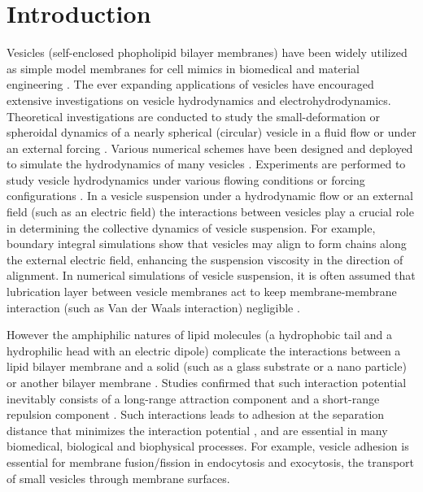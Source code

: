 \documentclass[%
preprint,
 amsmath,amssymb,
 aps,
]{revtex4-1}
\begin{document}

\section{Introduction}
Vesicles (self-enclosed phopholipid bilayer membranes) have been widely utilized
as simple model membranes for cell mimics in biomedical and material engineering \cite{}. 
%
The ever expanding applications of vesicles have encouraged extensive investigations on vesicle hydrodynamics
and electrohydrodynamics.
Theoretical investigations are conducted to study the small-deformation or spheroidal dynamics of a nearly spherical (circular) vesicle in a fluid flow or under an external forcing \cite{Barthes-BieselRallison1981_JFM,Misbah2006_PRL,Vlahovska2007_PRE,Finken2008_EPL,ZhangZahnTanLin2013_PoF,Nganguia2013_PRE}. 
Various numerical schemes have been designed and deployed to simulate the hydrodynamics of many vesicles \cite{BagchiJohoson2005_JBE,Biben2005_EJP,Veerapaneni2009_JCP,SeolHuKimLai2016_JCP}.  
Experiments are performed to study vesicle hydrodynamics under various flowing conditions or forcing configurations \cite{MaderVitkova2006_EurPhysJE, Abkarian2008_SoftMatt,DahlNarsimhanGouveia2016_SoftMatt}. In a vesicle suspension under 
a hydrodynamic flow or an external field (such as an electric field) 
the interactions between
vesicles play a crucial role in determining the collective dynamics of
vesicle suspension. For example, boundary integral simulations show that
vesicles may align to form chains along the external electric field,
enhancing the suspension viscosity in the direction of alignment.
In numerical simulations of vesicle suspension, it is often assumed that lubrication layer between vesicle membranes act to keep
membrane-membrane interaction (such as Van der Waals interaction) negligible \cite{BagchiJohoson2005_JBE,Veerapaneni2009_JCP}.

However the amphiphilic natures of lipid molecules (a hydrophobic tail and a hydrophilic head with an electric dipole) complicate the
interactions between a lipid bilayer membrane and a solid (such as a glass substrate or a nano particle) or another bilayer membrane \cite{EvansMetcalfe1984_BJ,Book_PhysicalBasisCellAdhesion,Book_IntermolecularSurfaceForces}.
Studies confirmed that such interaction potential inevitably consists of a long-range attraction component and a short-range repulsion component 
\cite{Book_IntermolecularSurfaceForces}. Such interactions leads to adhesion at the separation distance that minimizes the
interaction potential \cite{Book_IntermolecularSurfaceForces}, and are essential in many biomedical, biological and biophysical processes.
For example, vesicle adhesion
is essential for membrane fusion/fission in endocytosis and exocytosis, the transport of small
vesicles through membrane surfaces.
\end{document}
